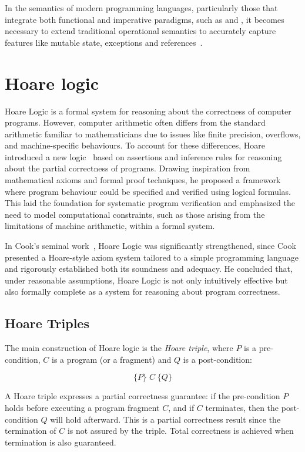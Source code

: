 In the semantics of modern programming languages, particularly those that integrate both functional and imperative paradigms, such as 
\ocaml and \cml, it becomes necessary to extend traditional operational semantics to accurately capture features like mutable state, 
exceptions and references~\cite{0001MS0U22}.

\section{Hoare logic}
\label{sec:Hoare_logic}

Hoare Logic is a formal system for reasoning about the correctness of computer programs. However, 
computer arithmetic often differs from the standard arithmetic familiar to mathematicians due to issues like finite 
precision, overflows, and machine-specific behaviours. To account for these differences, Hoare introduced a new logic~\cite{Hoare69}
based on assertions and inference rules for reasoning about the partial correctness of programs. Drawing inspiration 
from mathematical axioms and formal proof techniques, he proposed a framework where program behaviour could be specified 
and verified using logical formulas. This laid the foundation for systematic program verification and emphasized the need 
to model computational constraints, such as those arising from the limitations of machine arithmetic, within a formal system.

In Cook's seminal work~\cite{0207005}, Hoare Logic was significantly strengthened, since Cook presented a Hoare-style axiom system 
tailored to a simple programming language and rigorously established both its soundness and adequacy. He concluded that, under 
reasonable assumptions, Hoare Logic is not only intuitively effective but also formally complete as a system for reasoning about 
program correctness.

\subsection{Hoare Triples}

The main construction of Hoare logic is the \textit{Hoare triple}, where $P$ is a pre-condition, $C$ is a program (or a fragment)
and $Q$ is a post-condition:

\[ 
  \{P\}\; C \;\{Q\}
\]

A Hoare triple expresses a partial correctness guarantee: if the pre-condition $P$ holds before executing a program fragment 
$C$, and if $C$ terminates, then the post-condition $Q$ will hold afterward. This is a partial correctness result since the 
termination of $C$ is not assured by the triple. Total correctness is achieved when termination is also guaranteed.

